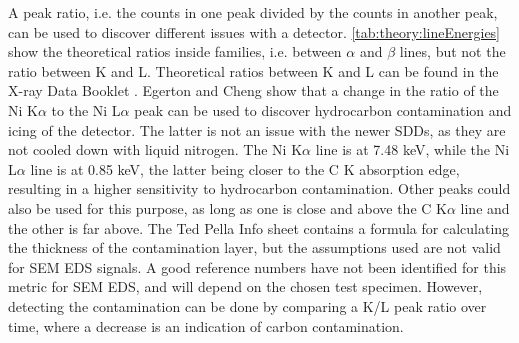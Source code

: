 A peak ratio, i.e. the counts in one peak divided by the counts in another peak, can be used to discover different issues with a detector.
\cref{tab:theory:lineEnergies} show the theoretical ratios inside families, i.e. between $\alpha$ and $\beta$ lines, but not the ratio between K and L.
Theoretical ratios between K and L can be found in the X-ray Data Booklet \cite{thompson_x-ray_2004}.
Egerton and Cheng \cite{egerton_nio_characterization_1994} show that a change in the ratio of the Ni K$\alpha$ to the Ni L$\alpha$ peak can be used to discover hydrocarbon contamination and icing of the detector.
The latter is not an issue with the newer SDDs, as they are not cooled down with liquid nitrogen.
The Ni K$\alpha$ line is at 7.48 keV, while the Ni L$\alpha$ line is at 0.85 keV, the latter being closer to the C K absorption edge, resulting in a higher sensitivity to hydrocarbon contamination.
Other peaks could also be used for this purpose, as long as one is close and above the C K$\alpha$ line and the other is far above.
The Ted Pella Info sheet \cite{ted_pella_nio_tem_2019} contains a formula for calculating the thickness of the contamination layer, but the assumptions used are not valid for SEM EDS signals.
A good reference numbers have not been identified for this metric for SEM EDS, and will depend on the chosen test specimen.
However, detecting the contamination can be done by comparing a K/L peak ratio over time, where a decrease is an indication of carbon contamination.


